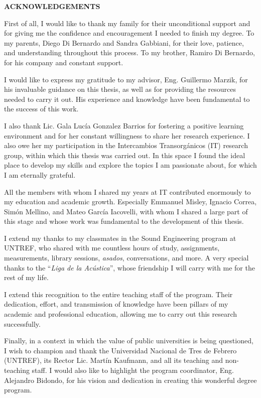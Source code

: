 \begin{centering}
\Large{\textbf{ACKNOWLEDGEMENTS}}

\end{centering}

First of all, I would like to thank my family for their unconditional support and for giving me the confidence and encouragement I needed to finish my degree. To my parents, Diego Di Bernardo and Sandra Gabbiani, for their love, patience, and understanding throughout this process. To my brother, Ramiro Di Bernardo, for his company and constant support.

I would like to express my gratitude to my advisor, Eng. Guillermo Marzik, for his invaluable guidance on this thesis, as well as for providing the resources needed to carry it out. His experience and knowledge have been fundamental to the success of this work.

I also thank Lic. Gala Lucía Gonzalez Barrios for fostering a positive learning environment and for her constant willingness to share her research experience. I also owe her my participation in the Intercambios Transorgánicos (IT) research group, within which this thesis was carried out. In this space I found the ideal place to develop my skills and explore the topics I am passionate about, for which I am eternally grateful.

All the members with whom I shared my years at IT contributed enormously to my education and academic growth. Especially Emmanuel Misley, Ignacio Correa, Simón Mellino, and Mateo García Iacovelli, with whom I shared a large part of this stage and whose work was fundamental to the development of this thesis.

I extend my thanks to my classmates in the Sound Engineering program at UNTREF, who shared with me countless hours of study, assignments, measurements, library sessions, \textit{asados}, conversations, and more. A very special thanks to the ``\textit{Liga de la Acústica}'', whose friendship I will carry with me for the rest of my life.

I extend this recognition to the entire teaching staff of the program. Their dedication, effort, and transmission of knowledge have been pillars of my academic and professional education, allowing me to carry out this research successfully.

Finally, in a context in which the value of public universities is being questioned, I wish to champion and thank the Universidad Nacional de Tres de Febrero (UNTREF), its Rector Lic. Martín Kaufmann, and all its teaching and non-teaching staff. I would also like to highlight the program coordinator, Eng. Alejandro Bidondo, for his vision and dedication in creating this wonderful degree program.


\newpage
